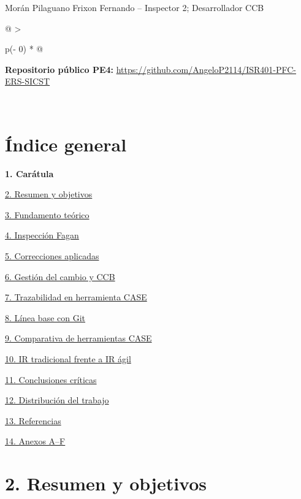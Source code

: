 \documentclass[12pt]{article}
\begin{document}
\begin{titlepage}
Morán Pilaguano Frixon Fernando -- Inspector 2; Desarrollador CCB

\begin{longtable}[]{@{}
  >{\raggedright\arraybackslash}p{(\columnwidth - 0\tabcolsep) * }@{}}
\toprule\noalign{}
\begin{minipage}[b]{\linewidth}\raggedright
\textbf{Repositorio público PE4: }\url{https://github.com/AngeloP2114/ISR401-PFC-ERS-SICST}
\end{minipage} \\
\midrule\noalign{}
\endhead
\bottomrule\noalign{}
\endlastfoot
\end{longtable}

\end{titlepage}
\clearpage
\section{\texorpdfstring{Índice general}{Índice general}}\label{uxedndice-general}
\noindent\textbf{1. Carátula}\par

\hyperref[resumen-y-objetivos]{{2. Resumen y objetivos}}

\hyperref[fundamento-teuxf3rico]{{3. Fundamento teórico}}

\hyperref[inspecciuxf3n-fagan]{{4. Inspección Fagan}}

\hyperref[correcciones-aplicadas]{{5. Correcciones aplicadas}}

\hyperref[gestiuxf3n-del-cambio-y-ccb]{{6. Gestión del cambio y CCB}}

\hyperref[trazabilidad-en-herramienta-case]{{7. Trazabilidad en herramienta CASE}}

\hyperref[luxednea-base-con-git]{{8. Línea base con Git}}

\hyperref[comparativa-de-herramientas-case]{{9. Comparativa de herramientas CASE}}

\hyperref[ir-tradicional-frente-a-ir-uxe1gil]{{10. IR tradicional frente a IR ágil}}

\hyperref[conclusiones-cruxedticas]{{11. Conclusiones críticas}}

\hyperref[distribuciuxf3n-del-trabajo]{{12. Distribución del trabajo}}

\hyperref[referencias]{{13. Referencias}}

\hyperref[anexos-af]{{14. Anexos A--F}}

\section{\texorpdfstring{2. Resumen y objetivos}{2. Resumen y objetivos}}\label{resumen-y-objetivos}
\end{document}
